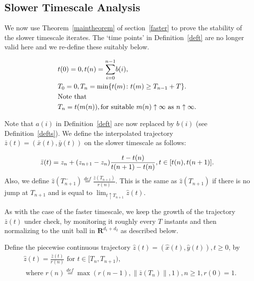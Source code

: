 \subsection{Slower Timescale Analysis}\label{slower}
We now use Theorem~\ref{maintheorem} of section~\ref{faster} to prove the stability of the slower timescale iterates. The `time points' in Definition~\ref{deft} are no longer valid here and we re-define these 
suitably below.
\begin{definition}\label{defts}
\begin{align}
&t(0)=0,t(n)=\overset{n-1}{\underset{i=0}{\sum}} b(i),\nonumber\\
&T_0=0, T_{n}=\min \{t(m) \colon t(m)\geq T_{n-1}+T\}.\nonumber\\
&\text{Note that}\nonumber\\
&T_n=t(m(n)), \mbox{for suitable } m(n)  \uparrow \infty  \mbox{ }\text{as} \mbox{ } n\uparrow \infty.
\end{align}
\end{definition}
Note that $a(i)$ in Definition~\ref{deft} are now replaced by $b(i)$ (see Definition~\ref{defts}).
We define the interpolated trajectory $\bar{z}(t)=(\bar{x}(t),\bar{y}(t))$ on the slower timescale 
as follows:
\begin{definition}\label{defply}
\begin{align}
\bar{z}(t)=z_n +(z_{n+1}-z_n)\frac{t-t(n)}{t(n+1)-t(n)}, t \in [t(n),t(n+1)].\nonumber
\end{align}
Also, we define $\hat{z}(T^{-}_{n+1})\stackrel{def}{=}\frac{\bar{z}(T_{n+1})}{r(n)}$. This is 
the same as $\hat{z}(T_{n+1})$ if there is no jump at $T_{n+1}$ and is equal to 
$\lim_{t\uparrow T_{n+1}}\hat{z}(t)$.
\end{definition}
\indent As with the case of the faster timescale, we keep the growth of the trajectory $\bar{z}(t)$ under 
check, by monitoring it roughly every $T$ instants and then normalizing to the unit ball in 
$\mathbf{R}^{d_1+d_2}$ as described below. 
\begin{definition}\label{defs}
Define the piecewise continuous trajectory $\hat{z}(t)=(\hat{x}(t),\hat{y}(t)), t\geq 0$, by
\begin{align}
&\hat{z}(t) = \frac{\bar{z}(t)}{r(n)} \text{~for~} t \in [T_n, T_{n+1}),\\
&\text{~where~} r(n)\stackrel{def}{=}\max(r(n-1),\parallel \bar{z}(T_n)\parallel,1), n \geq 1, r(0)=1.\\
\end{align}
\end{definition}

